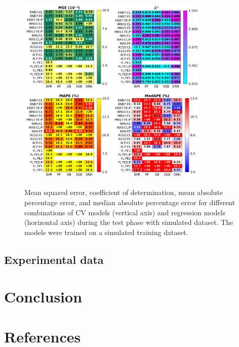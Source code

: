 \documentclass[10pt]{iopart}
\begin{document}
\begin{figure}
\centering
\includegraphics[width=0.4\textwidth]{Fig6a}
\includegraphics[width=0.4\textwidth]{Fig6b}
\includegraphics[width=0.4\textwidth]{Fig6c}
\includegraphics[width=0.4\textwidth]{Fig6d}
\caption{
Mean squared error, coefficient of determination, mean absolute percentage error, and median absolute percentage error 
for different combinations of CV models (vertical axis) and regression models (horizontal axis) 
during the test phase with simulated dataset. 
The models were trained on a simulated training dataset.
}\label{Fig6}
\end{figure}


\subsection{Experimental data}

\section{Conclusion}

\section*{References}



\end{document}
